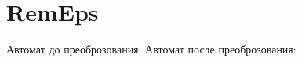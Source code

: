 \section{RemEps}
\begin{frame}{}
	Автомат до преоброзования:
	Автомат после преоброзования:
\end{frame}
